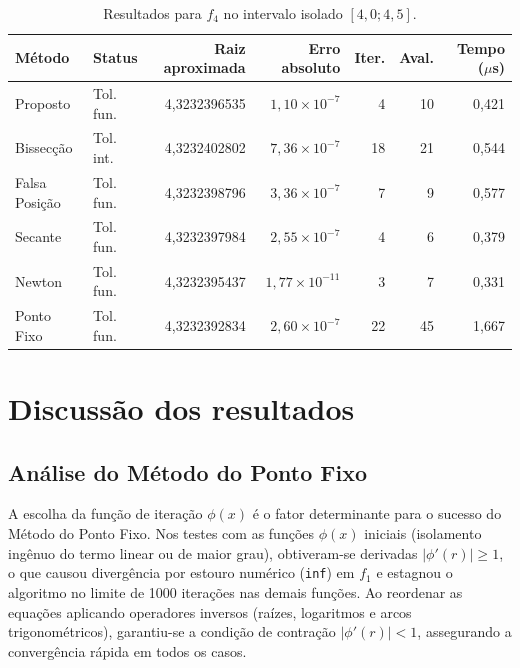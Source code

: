 \documentclass[12pt,a4paper]{article}
\begin{document}
\begin{table}[H]
\centering
\caption{Resultados para $f_4$ no intervalo isolado $[4,0;4,5]$.}
\label{tab:f4}
\small
\begin{tabular}{l l r r r r r}
\toprule
Método & Status & Raiz aproximada & Erro absoluto & Iter. & Aval. & Tempo ($\mu$s) \\
\midrule
Proposto & Tol. fun. & 4,3232396535 & $1,10\times10^{-7}$ & 4 & 10 & 0,421 \\
Bissecção & Tol. int. & 4,3232402802 & $7,36\times10^{-7}$ & 18 & 21 & 0,544 \\
Falsa Posição & Tol. fun. & 4,3232398796 & $3,36\times10^{-7}$ & 7 & 9 & 0,577 \\
Secante & Tol. fun. & 4,3232397984 & $2,55\times10^{-7}$ & 4 & 6 & 0,379 \\
Newton & Tol. fun. & 4,3232395437 & $1,77\times10^{-11}$ & 3 & 7 & 0,331 \\
Ponto Fixo & Tol. fun. & 4,3232392834 & $2,60\times10^{-7}$ & 22 & 45 & 1,667 \\
\bottomrule
\end{tabular}
\end{table}

\section{Discussão dos resultados}

\subsection{Análise do Método do Ponto Fixo}

A escolha da função de iteração $\phi(x)$ é o fator determinante para o sucesso do Método do Ponto Fixo. Nos testes com as funções $\phi(x)$ iniciais (isolamento ingênuo do termo linear ou de maior grau), obtiveram-se derivadas $|\phi'(r)| \ge 1$, o que causou divergência por estouro numérico (\texttt{inf}) em $f_1$ e estagnou o algoritmo no limite de 1000 iterações nas demais funções. Ao reordenar as equações aplicando operadores inversos (raízes, logaritmos e arcos trigonométricos), garantiu-se a condição de contração $|\phi'(r)| < 1$, assegurando a convergência rápida em todos os casos.
\end{document}
